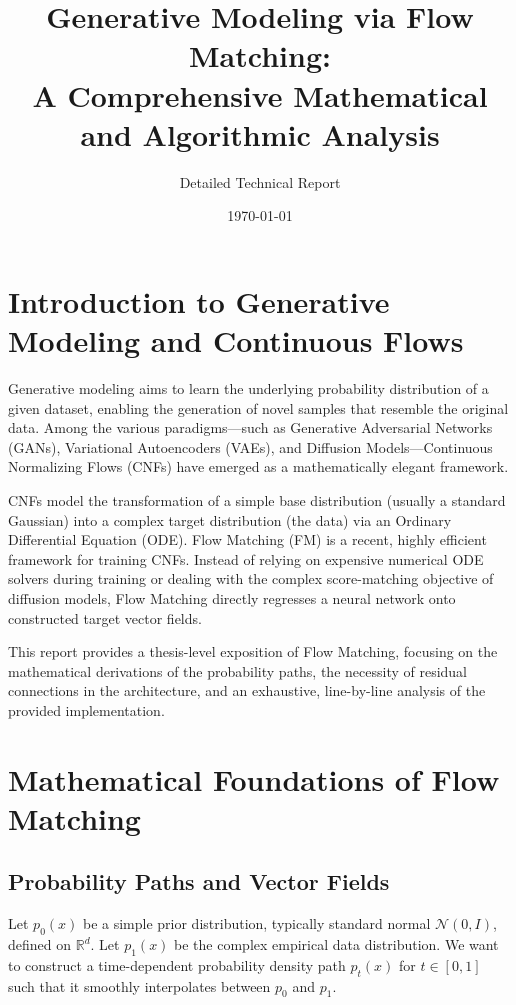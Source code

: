 \documentclass[12pt]{article}
\title{\textbf{Generative Modeling via Flow Matching:\\ A Comprehensive Mathematical and Algorithmic Analysis}}
\author{Detailed Technical Report}
\date{\today}
\begin{document}
\maketitle
\tableofcontents
\newpage

\section{Introduction to Generative Modeling and Continuous Flows}
Generative modeling aims to learn the underlying probability distribution of a given dataset, enabling the generation of novel samples that resemble the original data. Among the various paradigms—such as Generative Adversarial Networks (GANs), Variational Autoencoders (VAEs), and Diffusion Models—Continuous Normalizing Flows (CNFs) have emerged as a mathematically elegant framework. 

CNFs model the transformation of a simple base distribution (usually a standard Gaussian) into a complex target distribution (the data) via an Ordinary Differential Equation (ODE). Flow Matching (FM) is a recent, highly efficient framework for training CNFs. Instead of relying on expensive numerical ODE solvers during training or dealing with the complex score-matching objective of diffusion models, Flow Matching directly regresses a neural network onto constructed target vector fields.

This report provides a thesis-level exposition of Flow Matching, focusing on the mathematical derivations of the probability paths, the necessity of residual connections in the architecture, and an exhaustive, line-by-line analysis of the provided implementation.

\section{Mathematical Foundations of Flow Matching}

\subsection{Probability Paths and Vector Fields}
Let $p_0(x)$ be a simple prior distribution, typically standard normal $\mathcal{N}(0, I)$, defined on $\mathbb{R}^d$. Let $p_1(x)$ be the complex empirical data distribution. We want to construct a time-dependent probability density path $p_t(x)$ for $t \in [0, 1]$ such that it smoothly interpolates between $p_0$ and $p_1$.
\end{document}
